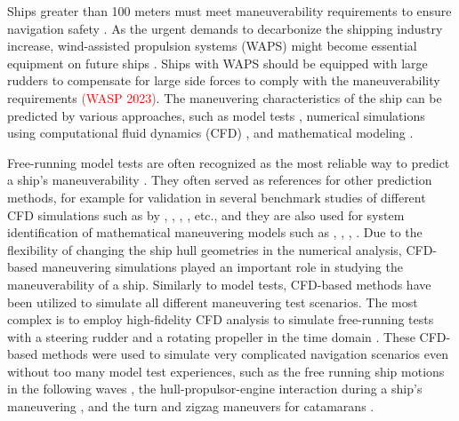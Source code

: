 Ships greater than 100 meters must meet maneuverability requirements to ensure navigation safety \citep{imoStandardsShipManoeuvrability2002}. As the urgent demands to decarbonize the shipping industry increase, wind-assisted propulsion systems (WAPS) might become essential equipment on future ships \citep{nelissenStudyAnalysisMarket2016}. Ships with WAPS should be equipped with large rudders to compensate for large side forces to comply with the maneuverability requirements \textcolor{red}{(WASP 2023)}. The maneuvering characteristics of the ship can be predicted by various approaches, such as model tests \citep{ittcManeuveringCommitteeITTC2008}, numerical simulations using computational fluid dynamics (CFD) \citep{elmoctarRANSBasedSimulatedShip2014,dumanTurnZigzagManoeuvres2022}, and mathematical modeling \citep{abkowitzMEASUREMENTHYDRODYNAMICCHARACTERISTICS1980,fossenHandbookMarineCraft2011,yasukawaIntroductionMMGStandard2015,alexanderssonSystemIdentificationPhysicsinformed2024b}. 

Free-running model tests are often recognized as the most reliable way to predict a ship's maneuverability \citep{ittcITTCRecommendedProcedures2008}. They often served as references for other prediction methods, for example for validation in several benchmark studies of different CFD simulations such as by \citet{sternExperienceSIMMAN20082011}, \citet{sakamotoURANSSimulationsStatic2012}, \citet{yoonBenchmarkCFDValidation2015a}, \citet{yasukawaValidation6DOFMotion2021}, etc., and they are also used for system identification of mathematical maneuvering models such as \citet{luoParameterIdentificationShip2016}, \citet{xuUncertaintyAnalysisHydrodynamic2019}, \citet{wangOptimalDesignExcitation2020}, \citet{alexanderssonSystemIdentificationVessel2022}. Due to the flexibility of changing the ship hull geometries in the numerical analysis, CFD-based maneuvering simulations played an important role in studying the maneuverability of a ship. Similarly to model tests, CFD-based methods have been utilized to simulate all different maneuvering test scenarios. The most complex is to employ high-fidelity CFD analysis to simulate free-running tests with a steering rudder and a rotating propeller in the time domain \citep{dubbiosoTurningAbilityAnalysis2016a, islamEstimationHydrodynamicDerivatives2018}. These CFD-based methods were used to simulate very complicated navigation scenarios even without too many model test experiences, such as the free running ship motions in the following waves \citep{arakiImprovedManeuveringBasedMathematical2019}, the hull-propulsor-engine interaction during a ship’s maneuvering \citep{elmoctarRANSBasedSimulatedShip2014}, and the turn and zigzag maneuvers for catamarans \citep{dumanTurnZigzagManoeuvres2022}.

